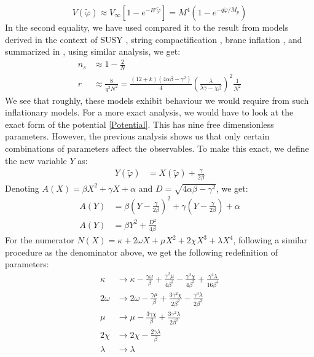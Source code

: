 \documentclass[aps,prd,reprint,preprintnumbers,showpacs,floatfix,nofootinbib,superscript address]{revtex4-2}
\begin{document}
\begin{equation}
    V(\tilde{\varphi}) \approx V_\infty [1 - e^{-B' \tilde{\varphi}} ] = M^4 (1 - e^{-q\tilde{\varphi}/M_p})
\end{equation}
In the second equality, we have used compared it to the result from models derived in the context of SUSY \cite{stewart_inflation_1995}, string compactification \cite{cicoli_fibre_2009}, brane inflation \cite{dvali_brane_1999}, and summarized in \cite{martin_encyclopaedia_2014}, using similar analysis, we get:
\begin{align}
    n_s &\approx 1 - \frac{2}{N} \\
    r &\approx \frac{8}{q^2N^2} = \frac{(12+k)(4\alpha\beta - \gamma^2)}{4} \left(\frac{\lambda}{\lambda \gamma - \chi \beta} \right)^2 \frac{1}{N^2} 
\end{align}
We see that roughly, these models exhibit behaviour we would require from such inflationary models. For a more exact analysis, we would have to look at the exact form of the potential \ref{Potential}. This has nine free dimensionless parameters. However, the previous analysis shows us that only certain combinations of parameters affect the observables. To make this exact, we define the new variable $Y$ as:
\begin{align}
    Y(\tilde{\varphi}) &= X(\tilde{\varphi}) + \frac{\gamma}{2\beta}
\end{align}
Denoting $A(X) = \beta X^2 + \gamma X + \alpha$ and $D = \sqrt{4\alpha\beta-\gamma^2}$, we get:
\begin{align}
    A(Y) &= \beta\left(Y - \frac{\gamma}{2\beta}\right)^2 + \gamma\left(Y - \frac{\gamma}{2\beta}\right) + \alpha \nonumber \\
    A(Y) &= \beta Y^2 + \frac{D^2}{4\beta} \nonumber
\end{align}
For the numerator $N(X) = \kappa + 2\omega X +\mu X^2 + 2\chi X^3 + \lambda X^4$, following a similar procedure as the denominator above, we get the following redefinition of parameters: 
\begin{align}
    \kappa &\rightarrow \kappa - \frac{\gamma\omega}{\beta} + \frac{\gamma^2\mu}{4\beta^2} - \frac{\gamma^3\chi}{4\beta^3} +\frac{\gamma^4\lambda}{16\beta^4}    \nonumber \\
    2\omega &\rightarrow 2\omega - \frac{\gamma\mu}{\beta} + \frac{3\gamma^2\chi}{2\beta^2} - \frac{\gamma^3\lambda}{2\beta^3}   \nonumber \\
    \mu &\rightarrow \mu - \frac{3\gamma\chi}{\beta} + \frac{3\gamma^2\lambda}{2\beta^2} \nonumber \\
    2\chi &\rightarrow 2\chi - \frac{2\gamma\lambda}{\beta} \nonumber \\
    \lambda &\rightarrow \lambda \label{huge redefiniton}
\end{align}
\end{document}
